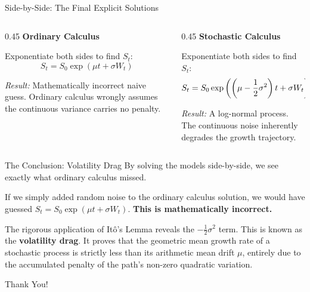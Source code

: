 \documentclass{beamer}
\begin{document}
\begin{frame}{Side-by-Side: The Final Explicit Solutions}
\begin{columns}[T]
\begin{column}{0.45\textwidth}
\textbf{Ordinary Calculus}
\vspace{0.3cm}

Exponentiate both sides to find $S_t$:
\[ S_t = S_0 \exp(\mu t + \sigma W_t) \]

\vspace{1.2cm}
\textit{Result:} Mathematically incorrect naive guess. Ordinary calculus wrongly assumes the continuous variance carries no penalty.
\end{column}
\hfill\vrule\hfill
\begin{column}{0.45\textwidth}
\textbf{Stochastic Calculus}
\vspace{0.3cm}

Exponentiate both sides to find $S_t$:
\[ S_t = S_0 \exp\left( \left(\mu - \frac{1}{2}\sigma^2\right)t 

\hfill + \sigma W_t \right) \]

\vspace{0.3cm}
\textit{Result:} A log-normal process. The continuous noise inherently degrades the growth trajectory.
\end{column}
\end{columns}
\end{frame}

\begin{frame}{The Conclusion: Volatility Drag}
By solving the models side-by-side, we see exactly what ordinary calculus missed. 

\vspace{0.5cm}
If we simply added random noise to the ordinary calculus solution, we would have guessed $S_t = S_0 \exp(\mu t + \sigma W_t)$. \textbf{This is mathematically incorrect.}

\vspace{0.5cm}
The rigorous application of It\^o's Lemma reveals the $-\frac{1}{2}\sigma^2$ term. This is known as the \textbf{volatility drag}. It proves that the geometric mean growth rate of a stochastic process is strictly less than its arithmetic mean drift $\mu$, entirely due to the accumulated penalty of the path's non-zero quadratic variation.
\end{frame}

	\begin{frame}
	\centering Thank You!
	\end{frame}
\end{document}
